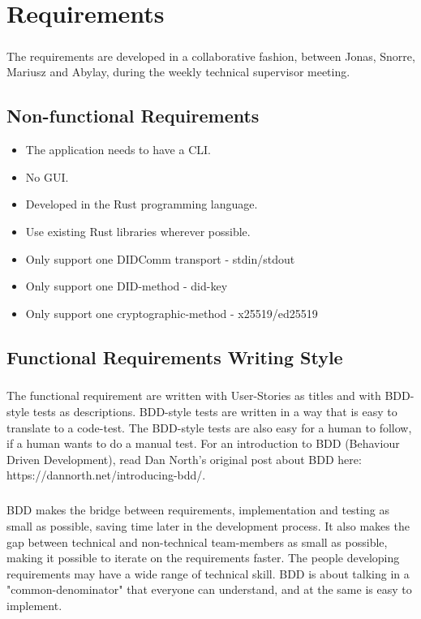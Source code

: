\chapter{Requirements}

\paragraph{}
The requirements are developed in a collaborative fashion, between Jonas, Snorre, Mariusz and Abylay, during the weekly technical supervisor meeting.

\section{Non-functional Requirements}

\begin{itemize}
\item The application needs to have a CLI.
\item No GUI.
\item Developed in the Rust programming language.
\item Use existing Rust libraries wherever possible.
\item Only support one DIDComm transport - stdin/stdout
\item Only support one DID-method - did-key
\item Only support one cryptographic-method - x25519/ed25519
\end{itemize}

\section{Functional Requirements Writing Style}

\paragraph{}
The functional requirement are written with User-Stories as titles and with BDD-style tests as descriptions. BDD-style tests are written in a way that is easy to translate to a code-test. The BDD-style tests are also easy for a human to follow, if a human wants to do a manual test. For an introduction to BDD (Behaviour Driven Development), read Dan North's original post about BDD here: https://dannorth.net/introducing-bdd/.

\paragraph{}
BDD makes the bridge between requirements, implementation and testing as small as possible, saving time later in the development process. It also makes the gap between technical and non-technical team-members as small as possible, making it possible to iterate on the requirements faster. The people developing requirements may have a wide range of technical skill. BDD is about talking in a "common-denominator" that everyone can understand, and at the same is easy to implement.

